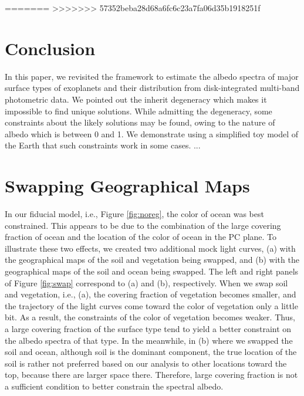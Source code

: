 \documentclass[iop,numberedappendix,apj,]{emulateapj}
\def\memoYF#1{\color{red}[YF: {\bf #1}]\color{black}}
\begin{document}
=======
>>>>>>> 57352beba28d68a6fc6c23a7fa06d35b1918251f

\section{Conclusion}
\label{s:conclusion}

In this paper, we revisited the framework to estimate the albedo spectra of major surface types of exoplanets and their distribution from disk-integrated multi-band photometric data. 
We pointed out the inherit degeneracy which makes it impossible to find unique solutions. 
While admitting the degeneracy, some constraints about the likely solutions may be found, owing to the nature of albedo which is between 0 and 1. 
We demonstrate using a simplified toy model of the Earth that such constraints work in some cases. 
...





\appendix


\section{Swapping Geographical Maps}

In our fiducial model, i.e., Figure \ref{fig:noreg}, the color of ocean was best constrained. 
%
This appears to be due to the combination of the large covering fraction of ocean and the location of the color of ocean in the PC plane. 
To illustrate these two effects, we created two additional mock light curves, (a) with the geographical maps of the soil and vegetation being swapped, and  (b) with the geographical maps of the soil and ocean being swapped. 
The left and right panels of Figure \ref{fig:swap} correspond to (a) and (b), respectively. 
%
When we swap soil and vegetation, i.e., (a), the covering fraction of vegetation becomes smaller, and the trajectory of the light curves come toward the color of vegetation only a little bit. As a result, the constraints of the color of vegetation becomes weaker. Thus, a large covering fraction of the surface type tend to yield a better constraint on the albedo spectra of that type. 
%
In the meanwhile, in (b) where we swapped the soil and ocean, although soil is the dominant component, the true location of the soil is rather not preferred based on our analysis to other locations toward the top, because there are larger space there. 
Therefore, large covering fraction is not a sufficient condition to better constrain the spectral albedo. 
\end{document}
